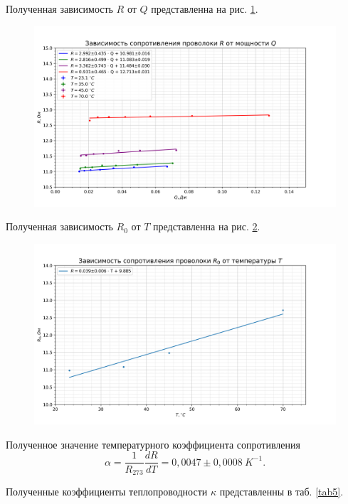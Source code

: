 \documentclass[a4paper, 12pt]{article}
\begin{document}
Полученная зависимость $R$ от $Q$ представленна на рис. \ref{ris3}.
\begin{figure}[h!]
\begin{flushleft}
    \includegraphics[scale=0.75]{2.2.3_1.png}
\end{flushleft}
\caption{}
\label{ris3}
\end{figure}

Полученная зависимость $R_0$ от $T$ представленна на рис. \ref{ris4}.
\begin{figure}[h!]
\begin{flushleft}
    \includegraphics[scale=0.75]{2.2.3_2.png}
\end{flushleft}
\caption{}
\label{ris4}
\end{figure}

Полученное значение температурного коэффициента сопротивления
$$\boxed{\alpha = \frac{1}{R_{273}}\frac{dR}{dT} = 0,0047\pm0,0008~K^{-1}}.$$

Полученные коэффициенты теплопроводности $\kappa$ представленны в таб. \ref{tab5}.
\end{document}

